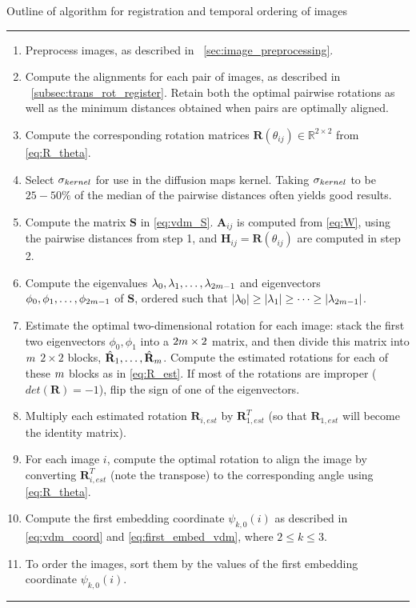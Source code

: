 \begin{table}[t]
\caption{Outline of algorithm for registration and temporal ordering of images}
\hrule
\begin{enumerate}
\item Preprocess images, as described in \sec~\ref{sec:image_preprocessing}.
%
\item Compute the alignments for each pair of images, as described in \sec~\ref{subsec:trans_rot_register}.
Retain both the optimal pairwise rotations as well as the minimum distances obtained when pairs are optimally aligned.
%
\item Compute the corresponding rotation matrices $\mathbf{R}(\theta_{ij}) \in \mathbb{R}^{2 \times 2}$ from \eqref{eq:R_theta}.
%
\item Select $\sigma_{kernel}$ for use in the diffusion maps kernel.
%
Taking $\sigma_{kernel}$ to be $25-50\%$ of the median of the pairwise distances often yields good results.
\item Compute the matrix $\mathbf{S}$ in \eqref{eq:vdm_S}.
$\mathbf{A}_{ij}$ is computed from \eqref{eq:W}, using the pairwise distances from step 1, and $\mathbf{H}_{ij} = \mathbf{R}(\theta_{ij})$ are computed in step 2.
%
\item Compute the eigenvalues  $\lambda_0, \lambda_1, \dots, \lambda_{2 m-1}$ and eigenvectors $\phi_0 , \phi_1, \dots, \phi_{2 m-1}$ of $\mathbf{S}$, ordered such that $|\lambda_0| \ge |\lambda_1| \ge \dots \ge |\lambda_{2 m-1}|$.
%
\item Estimate the optimal two-dimensional rotation for each image: stack the first two eigenvectors $\phi_0, \phi_1$ into a $2 m \times 2$ matrix, and then divide this matrix into $m$ $2 \times 2$ blocks, $\hat{\mathbf{R}}_1, \dots, \hat{\mathbf{R}}_m$. Compute the estimated rotations for each of these $m$ blocks as in \eqref{eq:R_est}. If most of the rotations are improper ($det(\mathbf{R}) = -1$), flip the sign of one of the eigenvectors.
\item Multiply each estimated rotation $\mathbf{R}_{i, est}$ by $\mathbf{R}_{1, est}^T$ (so that $\mathbf{R}_{1, est}$ will become the identity matrix).
\item For each image $i$, compute the optimal rotation to align the image by converting $\mathbf{R}_{i, est}^T$ (note the transpose) to the corresponding angle using \eqref{eq:R_theta}.
\item Compute the first embedding coordinate $\psi_{k,0}(i)$ as described in \eqref{eq:vdm_coord} and \eqref{eq:first_embed_vdm}, where $2 \le k \le 3$.
\item To order the images, sort them by the values of the first embedding coordinate $\psi_{k,0}(i)$.
\end{enumerate}
\hrule
\end{table}

